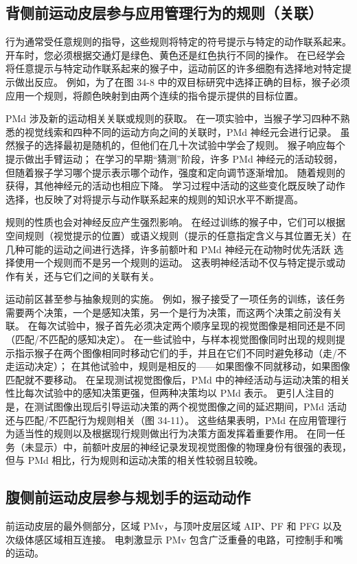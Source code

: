 \subsection{背侧前运动皮层参与应用管理行为的规则（关联）}
行为通常受任意规则的指导，这些规则将特定的符号提示与特定的动作联系起来。 开车时，您必须根据交通灯是绿色、黄色还是红色执行不同的操作。 在已经学会将任意提示与特定动作联系起来的猴子中，运动前区的许多细胞有选择地对特定提示做出反应。 例如，为了在图 34-8 中的双目标研究中选择正确的目标，猴子必须应用一个规则，将颜色映射到由两个连续的指令提示提供的目标位置。

PMd 涉及新的运动相关关联或规则的获取。 在一项实验中，当猴子学习四种不熟悉的视觉线索和四种不同的运动方向之间的关联时，PMd 神经元会进行记录。 虽然猴子的选择最初是随机的，但他们在几十次试验中学会了规则。 猴子响应每个提示做出手臂运动； 在学习的早期“猜测”阶段，许多 PMd 神经元的活动较弱，但随着猴子学习哪个提示表示哪个动作，强度和定向调节逐渐增加。 随着规则的获得，其他神经元的活动也相应下降。 学习过程中活动的这些变化既反映了动作选择，也反映了对将提示与动作联系起来的规则的知识水平不断提高。

规则的性质也会对神经反应产生强烈影响。 在经过训练的猴子中，它们可以根据空间规则（视觉提示的位置）或语义规则（提示的任意指定含义与其位置无关）在几种可能的运动之间进行选择，许多前额叶和 PMd 神经元在动物时优先活跃 选择使用一个规则而不是另一个规则的运动。 这表明神经活动不仅与特定提示或动作有关，还与它们之间的关联有关。

运动前区甚至参与抽象规则的实施。 例如，猴子接受了一项任务的训练，该任务需要两个决策，一个是感知决策，另一个是行为决策，而这两个决策之前没有关联。 在每次试验中，猴子首先必须决定两个顺序呈现的视觉图像是相同还是不同（匹配/不匹配的感知决定）。 在一些试验中，与样本视觉图像同时出现的规则提示指示猴子在两个图像相同时移动它们的手，并且在它们不同时避免移动（走/不走运动决定）； 在其他试验中，规则是相反的——如果图像不同就移动，如果图像匹配就不要移动。 在呈现测试视觉图像后，PMd 中的神经活动与运动决策的相关性比每次试验中的感知决策更强，但两种决策均以 PMd 表示。 更引人注目的是，在测试图像出现后引导运动决策的两个视觉图像之间的延迟期间，PMd 活动还与匹配/不匹配行为规则相关（图 34-11）。 这些结果表明，PMd 在应用管理行为适当性的规则以及根据现行规则做出行为决策方面发挥着重要作用。 在同一任务（未显示）中，前额叶皮层的神经记录发现视觉图像的物理身份有很强的表现，但与 PMd 相比，行为规则和运动决策的相关性较弱且较晚。



\subsection{腹侧前运动皮层参与规划手的运动动作}
前运动皮层的最外侧部分，区域 PMv，与顶叶皮层区域 AIP、PF 和 PFG 以及次级体感区域相互连接。 电刺激显示 PMv 包含广泛重叠的电路，可控制手和嘴的运动。

